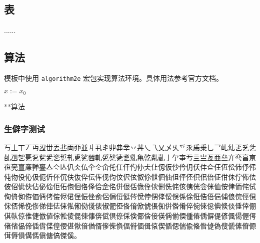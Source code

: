 \subsection{表}
......

\subsection{算法}
模板中使用 \texttt{algorithm2e} 宏包实现算法环境。具体用法参考官方文档。

\begin{algorithm}
  \SetAlgoLined
  $x:=x_{0}$\;
  \caption{**算法}
  \label{algo:algorithm1}
\end{algorithm}

\nocite{*}

\subsubsection{生僻字测试}
丂丄丅丆丏丒丗丟丠両丣並丩丮丯丱丳丵丷丼乀乁乂乄乆乊乑乕乗乚乛乢乣乤乥乧乨乪乫乬乭乮乯乲乴乵乶乷乸乹乺乻乼乽乿亀亁亃亄亅亇亊亐亖亗亙亜亝亣亪亯亰亱亴亶亷亸亹亼亽亾仈仌仏仐仒仚仛仜仠仢仦仧仩仭仮仯仱仴仸仹仺仼仾伀伂伃伄伅伆伇伈伋伌伒伓伔伕伖伜伝伡伣伨伩伬伭伮伱伳伵伷伹伻伾伿佀佁佂佄佅佇佈佉佊佋佌佒佔佖佡佢佦佨佪佫佭佮佱佲併佷佸佹佺佽侀侁侂侅侇侊侌侎侐侒侓侕侘侙侚侜侞侟価侢侤侫侭侰侱侲侳侴侶侷侸侹侺侻侼侽侾俀俁係俆俇俈俉俋俌俍俒俓俔俕俖俙俛俢俤俥俧俫俬俰俲俴俵俶俷俹俻俼俽俿倀倁倂倃倄倅倇倈倊倎倐倓倕倖倗倛倝倞倠倢倣値倧倯倰倱倲倳倴倵倶倷倸倹倻倽倿偀偁偂偄偅偆偊偋偍偐偑偒偓偔偖偗偘偙偛偝偞偟偠偡偢偣偤偦偧偨偩偪偫偭偮偯偰偱偲偳偸偹偺偼偽傁傂傃傄傆傇傉傊傋傌傎傏傐傑傒。

